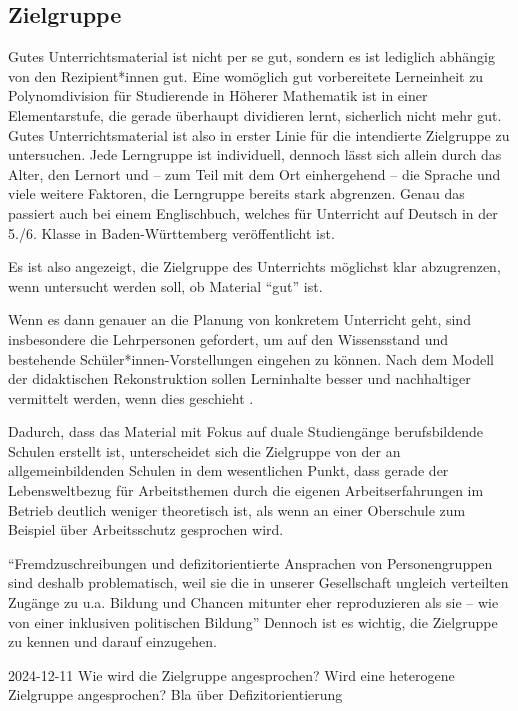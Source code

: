 \subsection{Zielgruppe}
Gutes Unterrichtsmaterial ist nicht per se gut, sondern es ist lediglich abhängig von den Rezipient*innen gut. Eine womöglich gut vorbereitete Lerneinheit zu Polynomdivision für Studierende in Höherer Mathematik ist in einer Elementarstufe, die gerade überhaupt dividieren lernt, sicherlich nicht mehr gut. Gutes Unterrichtsmaterial ist also in erster Linie für die intendierte Zielgruppe zu untersuchen. Jede Lerngruppe ist individuell, dennoch lässt sich allein durch das Alter, den Lernort und -- zum Teil  mit dem Ort einhergehend -- die Sprache und viele weitere Faktoren, die Lerngruppe bereits stark abgrenzen. Genau das passiert auch bei einem Englischbuch, welches für Unterricht auf Deutsch in der 5./6. Klasse in Baden-Württemberg veröffentlicht ist. 

Es ist also angezeigt, die Zielgruppe des Unterrichts möglichst klar abzugrenzen, wenn untersucht werden soll, ob Material \enquote{gut} ist. 


Wenn es dann genauer an die Planung von konkretem Unterricht geht, sind insbesondere die Lehrpersonen gefordert, um auf den Wissensstand und bestehende Schüler*innen-Vorstellungen eingehen zu können. Nach dem Modell der didaktischen Rekonstruktion sollen Lerninhalte besser und nachhaltiger vermittelt werden, wenn dies geschieht \autocite[404-406]{Reinfried2009}.

Dadurch, dass das Material mit Fokus auf duale Studiengänge berufsbildende Schulen erstellt ist, unterscheidet sich die Zielgruppe von der an allgemeinbildenden Schulen in dem wesentlichen Punkt, dass gerade der Lebensweltbezug für Arbeitsthemen durch die eigenen Arbeitserfahrungen im Betrieb deutlich weniger theoretisch ist, als wenn an einer Oberschule zum Beispiel über Arbeitsschutz gesprochen wird. 

\enquote{Fremdzuschreibungen und defizitorientierte Ansprachen von Personengruppen sind deshalb problematisch, weil sie die in unserer Gesellschaft ungleich verteilten Zugänge zu u.a. Bildung und Chancen mitunter eher reproduzieren als sie – wie von einer inklusiven politischen Bildung} \autocite[]{Beckmann2022}
Dennoch ist es wichtig, die Zielgruppe zu kennen und darauf einzugehen.



2024-12-11
Wie wird die Zielgruppe angesprochen?
Wird eine heterogene Zielgruppe angesprochen?
Bla über Defizitorientierung

